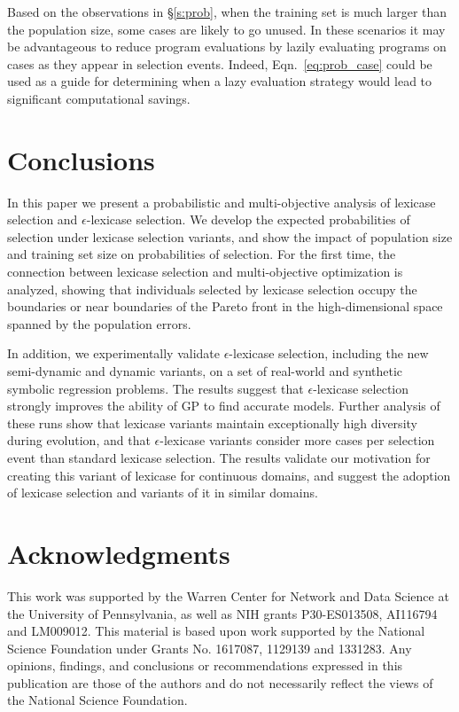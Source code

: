 \documentclass[twoside]{article}
\begin{document}
Based on the observations in \S\ref{s:prob}, when the training set is much larger than the population size, some cases are likely to go unused. In these scenarios it may be advantageous to reduce program evaluations by lazily evaluating programs on cases as they appear in selection events. Indeed, Eqn.~\ref{eq:prob_case} could be used as a guide for determining when a lazy evaluation strategy would lead to significant computational savings.

\section{Conclusions}\label{s:conclusion}
In this paper we present a probabilistic and multi-objective analysis of lexicase selection and $\epsilon$-lexicase selection. We develop the expected probabilities of selection under lexicase selection variants, and show the impact of population size and training set size on probabilities of selection. For the first time, the connection between lexicase selection and multi-objective optimization is analyzed, showing that individuals selected by lexicase selection occupy the boundaries or near boundaries of the Pareto front in the high-dimensional space spanned by the population errors. 

In addition, we experimentally validate $\epsilon$-lexicase selection, including the new semi-dynamic and dynamic variants, on a set of real-world and synthetic symbolic regression problems. The results suggest that $\epsilon$-lexicase selection strongly improves the ability of GP to find accurate models. Further analysis of these runs show that lexicase variants maintain exceptionally high diversity during evolution, and that $\epsilon$-lexicase variants consider more cases per selection event than standard lexicase selection. The results validate our motivation for creating this variant of lexicase for continuous domains, and suggest the adoption of lexicase selection and variants of it in similar domains.  

\section{Acknowledgments}
This work was supported by the Warren Center for Network and Data Science at the University of Pennsylvania, as well as NIH grants P30-ES013508, AI116794 and LM009012. This material is based upon work supported by the National Science Foundation under Grants No. 1617087, 1129139 and 1331283. Any opinions, findings, and conclusions or recommendations expressed in this publication are those of the authors and do not necessarily reflect the views of the National Science Foundation.




\end{document}

